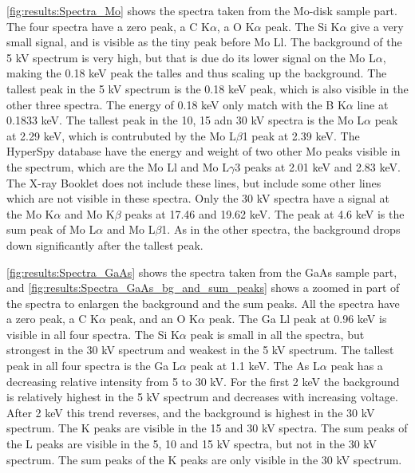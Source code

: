 \cref{fig:results:Spectra_Mo} shows the spectra taken from the Mo-disk sample part.
The four spectra have a zero peak, a C K$\alpha$, a O K$\alpha$ peak.
The Si K$\alpha$ give a very small signal, and is visible as the tiny peak before Mo Ll.
The background of the 5 kV spectrum is very high, but that is due do its lower signal on the Mo L$\alpha$, making the 0.18 keV peak the talles and thus scaling up the background.
The tallest peak in the 5 kV spectrum is the 0.18 keV peak, which is also visible in the other three spectra.
The energy of 0.18 keV only match with the B K$\alpha$ line at 0.1833 keV. %
The tallest peak in the 10, 15 adn 30 kV spectra is the Mo L$\alpha$ peak at 2.29 keV, which is contrubuted by the Mo L$\beta$1 peak at 2.39 keV.
The HyperSpy database have the energy and weight of two other Mo peaks visible in the spectrum, which are the Mo Ll and Mo L$\gamma$3 peaks at 2.01 keV and 2.83 keV.
The X-ray Booklet does not include these lines, but include some other lines which are not visible in these spectra.
Only the 30 kV spectra have a signal at the Mo K$\alpha$ and Mo K$\beta$ peaks at 17.46 and 19.62 keV. %
The peak at 4.6 keV is the sum peak of Mo L$\alpha$ and Mo L$\beta$1.
As in the other spectra, the background drops down significantly after the tallest peak.




\cref{fig:results:Spectra_GaAs} shows the spectra taken from the GaAs sample part, and \cref{fig:results:Spectra_GaAs_bg_and_sum_peaks} shows a zoomed in part of the spectra to enlargen the background and the sum peaks.
All the spectra have a zero peak, a C K$\alpha$ peak, and an O K$\alpha$ peak.
The Ga Ll peak at 0.96 keV is visible in all four spectra.
The Si K$\alpha$ peak is small in all the spectra, but strongest in the 30 kV spectrum and weakest in the 5 kV spectrum.
The tallest peak in all four spectra is the Ga L$\alpha$ peak at 1.1 keV.
The As L$\alpha$ peak has a decreasing relative intensity from 5 to 30 kV.
For the first 2 keV the background is relatively highest in the 5 kV spectrum and decreases with increasing voltage.
After 2 keV this trend reverses, and the background is highest in the 30 kV spectrum. %
The K peaks are visible in the 15 and 30 kV spectra.
The sum peaks of the L peaks are visible in the 5, 10 and 15 kV spectra, but not in the 30 kV spectrum.
The sum peaks of the K peaks are only visible in the 30 kV spectrum. %


